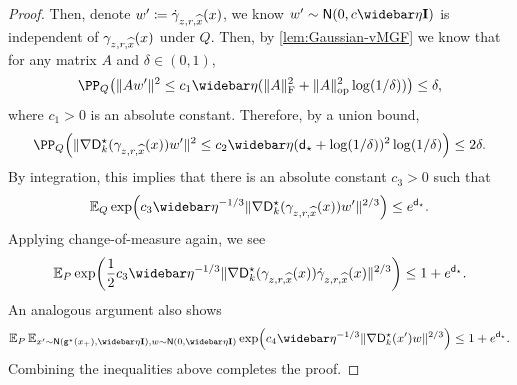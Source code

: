 \begin{proof}
Then, denote $w'\coloneqq \dot \gamma_{z,r,\widehat{x}}(x)$, we know $w'\sim \normal{0,c\etabar\Id}$ is independent of $\gamma_{z,r,\widehat{x}}(x)$ under $Q$.
Then, by \cref{lem:Gaussian-vMGF} we know that for any matrix $A$ and $\delta\in(0,1)$,
\begin{align*}
    \PP_Q\prn*{ \nrm{Aw'}^2\leq c_1\etabar(\nrmF{A}^2+\nrmop{A}^2\log(1/\delta)) }\leq \delta,
\end{align*}
where $c_1>0$ is an absolute constant. Therefore, by a union bound,
\begin{align*}
    \PP_Q\prn*{ \nrm{\nabla \Ds_k(\gamma_{z,r,\xhat}(x)) w'}^2\leq c_2\etabar(\dbar+\log(1/\delta))^2\log(1/\delta) }\leq 2\delta.
\end{align*}
By integration, this implies that there is an absolute constant $c_3>0$ such that
\begin{align*}
\En_Q \exp\prn*{ c_3\etabar ^{-1/3}\nrm{\nabla \Ds_k(\gamma_{z,r,\xhat}(x)) w'}^{2/3} }\leq e^{\dbar}.
\end{align*}
Applying change-of-measure again, we see
\begin{align*}
\En_P \exp\prn*{ \frac12 c_3\etabar ^{-1/3}\nrm{\nabla \Ds_k(\gamma_{z,r,\xhat}(x)) \dot \gamma_{z,r,\xhat}(x)}^{2/3} }\leq 1+e^{\dbar}.
\end{align*}
An analogous argument also shows 
\begin{align*}
\En_P \En_{x'\sim \normal{\gds(x_+),\etabar\Id}, w\sim \normal{0,\etabar\Id}} \exp\prn*{ c_4\etabar ^{-1/3}\nrm{\nabla \Ds_k(x') w}^{2/3} }\leq 1+e^{\dbar}.
\end{align*}
Combining the inequalities above completes the proof.
\end{proof}

